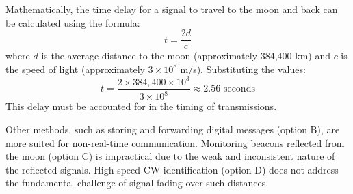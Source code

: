 Mathematically, the time delay for a signal to travel to the moon and back can be calculated using the formula:
\[
t = \frac{2d}{c}
\]
where \( d \) is the average distance to the moon (approximately 384,400 km) and \( c \) is the speed of light (approximately \( 3 \times 10^8 \) m/s). Substituting the values:
\[
t = \frac{2 \times 384,400 \times 10^3}{3 \times 10^8} \approx 2.56 \text{ seconds}
\]
This delay must be accounted for in the timing of transmissions.

Other methods, such as storing and forwarding digital messages (option B), are more suited for non-real-time communication. Monitoring beacons reflected from the moon (option C) is impractical due to the weak and inconsistent nature of the reflected signals. High-speed CW identification (option D) does not address the fundamental challenge of signal fading over such distances.

